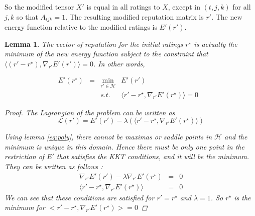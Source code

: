 \documentclass[12pt,a4paper]{article}
\newtheorem{lemma}{Lemma}
\begin{document}
So the modified tensor $X'$ is equal in all ratings to $X$, except in $(t,j,k)$ for all $j,k$ so that $A_{tjk}=1$. The resulting modified reputation matrix is $r'$. The new energy function relative to the modified ratings is $E'(r')$.
\begin{lemma}
The vector of reputation for the initial ratings $r^{\star}$ is actually the minimum of the new energy function subject to the constraint that $\langle (r'-r^{\star}),\nabla_{r'} E'(r')\rangle = 0$. In other words, 

\begin{align*} 
 E'(r^{\star}) & = &  \min_{r'\in \mathcal{H}} & E'(r')& \\
& & s.t.  \:\:  & \langle r'-r^{\star},\nabla_{r'} E'(r^{\star}) \rangle =0
\end{align*}

\begin{proof}
The Lagrangian of the problem can be written as
$$\mathcal{L}(r') = E'(r') - \lambda (\langle r' - r^{\star},\nabla_{r'} E'(r^{\star}) \rangle )$$

Using lemma \ref{eq:poly}, there cannot be maximas or saddle points in $\mathcal{H}$ and the minimum is unique in this domain. Hence there must be only one point in the restriction of $E'$ that satisfies the KKT conditions, and it will be the minimum.\\
They can be written as follows :
\begin{align*}
\nabla_{r'} E'(r') - \lambda \nabla_{r'} E'(r^{\star}) & = & 0\\
\langle r'-r^{\star},\nabla_{r'} E'(r^{\star}) \rangle & = & 0
\end{align*}
We can see that these conditions are satisfied for $r' = r^{\star}$ and $\lambda = 1$. So $r^{\star}$ is the minimum for $<r'-r^{\star},\nabla_{r'} E'(r^{\star})>=0$
\end{proof}
\end{lemma}
\end{document}
